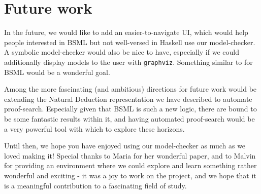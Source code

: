 \documentclass[11pt,a4paper]{article}
\begin{document}











\section{Future work}
In the future, we would like to add an easier-to-navigate UI, which would help people interested in BSML 
but not well-versed in Haskell use our model-checker. A symbolic model-checker would 
also be nice to have, especially if we could additionally display models to the user with \verb|graphviz|.
Something similar to \cite{gattinger2024:software:SMCDEL} for BSML would be a wonderful goal. 

Among the more fascinating (and ambitious) directions for future work would be extending the Natural Deduction representation
we have described to automate proof-search. Especially given that BSML is such a new logic, there are bound to be some fantastic results 
within it, and having automated proof-search would be a very powerful tool with which to explore these horizons. 

Until then, we hope you have enjoyed using our model-checker as much as we loved making it! Special thanks 
to Maria for her wonderful paper, and to Malvin for providing an environment where we could explore and learn 
something rather wonderful and exciting - it was a joy to work on the project, and we hope that it is a meaningful contribution 
to a fascinating field of study. 



\end{document}
